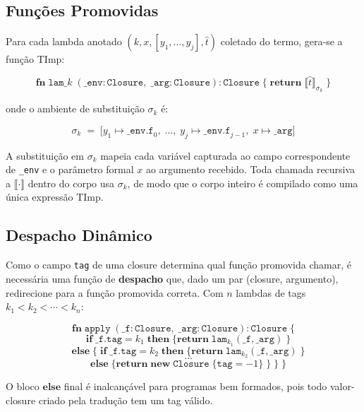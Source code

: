 \subsection{Funções Promovidas}

Para cada lambda anotado \((k, x, [y_1,\ldots,y_j], \hat{t})\) coletado
do termo, gera-se a função TImp:

\[
  \mathbf{fn}\;\mathtt{lam}\_k\;
  (\mathtt{\_env} : \mathtt{Closure},\;
  \mathtt{\_arg} : \mathtt{Closure}) :
  \mathtt{Closure}\;\{
  \;\mathbf{return}\;
  \llbracket \hat{t} \rrbracket_{\sigma_k}\;\}
\]

onde o ambiente de substituição \(\sigma_k\) é:

\[
  \sigma_k \;=\;
  \bigl[y_1 \mapsto \mathtt{\_env.f}_0,\;\ldots,\;
  y_j \mapsto \mathtt{\_env.f}_{j-1},\;
  x \mapsto \mathtt{\_arg}\bigr]
\]

A substituição em \(\sigma_k\) mapeia cada variável capturada ao
campo correspondente de \texttt{\_env} e o parâmetro formal \(x\) ao
argumento recebido. Toda chamada recursiva a \(\llbracket \cdot
\rrbracket\) dentro do corpo usa \(\sigma_k\), de modo que o corpo
inteiro é compilado como uma única expressão TImp.

\subsection{Despacho Dinâmico}

Como o campo \texttt{tag} de uma closure determina qual função promovida
chamar, é necessária uma função de \textbf{despacho} que, dado um par
(closure, argumento), redirecione para a função promovida correta. Com
\(n\) lambdas de tags \(k_1 < k_2 < \cdots < k_n\):

\[
  \mathbf{fn}\;\mathtt{apply}\;
  (\mathtt{\_f} : \mathtt{Closure},\;
  \mathtt{\_arg} : \mathtt{Closure}) :
  \mathtt{Closure}\;\{
\]
\[
  \quad \mathbf{if}\;\mathtt{\_f.tag} = k_1\;
  \mathbf{then}\;\{\mathbf{return}\;\mathtt{lam}_{k_1}(\mathtt{\_f}, \mathtt{\_arg})\;\}
\]
\[
  \quad \mathbf{else}\;\{\;\mathbf{if}\;\mathtt{\_f.tag} = k_2\;\mathbf{then}\;
  \{\mathbf{return}\;\mathtt{lam}_{k_2}(\mathtt{\_f}, \mathtt{\_arg})\;\}
\]
\[
  \quad \ldots
\]
\[
  \quad\mathbf{else}\;\{\mathbf{return}\;
  \mathbf{new}\;\mathtt{Closure}\;\{\mathtt{tag} = {-1}\}\;\}\;\}\;\}
\]

O bloco \(\mathbf{else}\) final é inalcançável para programas bem
formados, pois todo valor-closure criado pela tradução tem um tag
válido.


